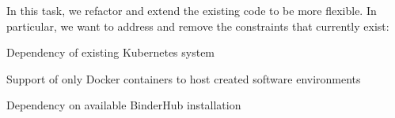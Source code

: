 \begin{task}[
  title=Reducing technical constraints for broader usage,
  id=constraints,
  lead=SRL,
  PM=1,
  wphases={0-36},
  partners={MP}
]

In this task, we refactor and extend the existing code to be more flexible. In
particular, we want to address and remove the constraints that currently exist:

\begin{compactitem}
  \item Dependency of existing Kubernetes system
  \item Support of only Docker containers to host created software environments
  \item Dependency on available BinderHub installation
  \end{compactitem}

\end{task}
